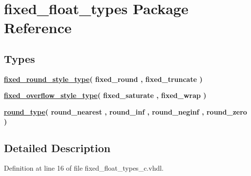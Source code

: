 \hypertarget{classfixed__float__types}{}\section{fixed\+\_\+float\+\_\+types Package Reference}
\label{classfixed__float__types}
\subsection*{Types}
 \begin{DoxyCompactItemize}
\item 
{\bfseries \hyperlink{classfixed__float__types_a531b370a8acfecdccebf696cf0d2d971}{fixed\+\_\+round\+\_\+style\+\_\+type}{\bfseries \textcolor{vhdlchar}{(}\textcolor{vhdlchar}{ }\textcolor{vhdlchar}{fixed\+\_\+round}\textcolor{vhdlchar}{ }\textcolor{vhdlchar}{,}\textcolor{vhdlchar}{ }\textcolor{vhdlchar}{fixed\+\_\+truncate}\textcolor{vhdlchar}{ }\textcolor{vhdlchar}{)}\textcolor{vhdlchar}{ }}} 
\item 
{\bfseries \hyperlink{classfixed__float__types_a8a8b6b0022e693377949251b05ac846a}{fixed\+\_\+overflow\+\_\+style\+\_\+type}{\bfseries \textcolor{vhdlchar}{(}\textcolor{vhdlchar}{ }\textcolor{vhdlchar}{fixed\+\_\+saturate}\textcolor{vhdlchar}{ }\textcolor{vhdlchar}{,}\textcolor{vhdlchar}{ }\textcolor{vhdlchar}{fixed\+\_\+wrap}\textcolor{vhdlchar}{ }\textcolor{vhdlchar}{)}\textcolor{vhdlchar}{ }}} 
\item 
{\bfseries \hyperlink{classfixed__float__types_a3cab38cfb8c7d6b81f4f0b9953cd212f}{round\+\_\+type}{\bfseries \textcolor{vhdlchar}{(}\textcolor{vhdlchar}{ }\textcolor{vhdlchar}{round\+\_\+nearest}\textcolor{vhdlchar}{ }\textcolor{vhdlchar}{,}\textcolor{vhdlchar}{ }\textcolor{vhdlchar}{round\+\_\+inf}\textcolor{vhdlchar}{ }\textcolor{vhdlchar}{,}\textcolor{vhdlchar}{ }\textcolor{vhdlchar}{round\+\_\+neginf}\textcolor{vhdlchar}{ }\textcolor{vhdlchar}{,}\textcolor{vhdlchar}{ }\textcolor{vhdlchar}{round\+\_\+zero}\textcolor{vhdlchar}{ }\textcolor{vhdlchar}{)}\textcolor{vhdlchar}{ }}} 
\end{DoxyCompactItemize}


\subsection{Detailed Description}


Definition at line 16 of file fixed\+\_\+float\+\_\+types\+\_\+c.\+vhdl.



